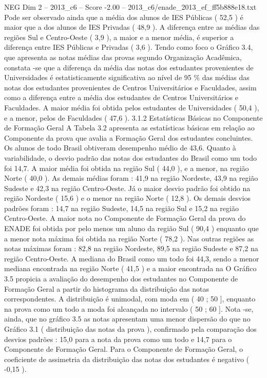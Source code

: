\begin{textsample}{NEG Dim 2 – 2013\_c6 – Score -2.00 – 2013\_c6/enade\_2013\_ef\_ff5b888e18.txt}
Pode ser observado ainda que a média dos alunos de IES Públicas ( 52,5 ) é maior que a dos alunos de IES Privadas ( 48,9 ).
A diferença entre as médias das regiões Sul e Centro-Oeste ( 3,9 ), a maior e a menor média, é superior a diferença entre IES Públicas e Privadas ( 3,6 ).
Tendo como foco o Gráfico 3.4, que apresenta as notas médias das provas segundo Organização Acadêmica, constata -se que a diferença da média das notas dos estudantes provenientes de Universidades é estatisticamente significativa ao nível de 95 \% das médias das notas dos estudantes provenientes de Centros Universitários e Faculdades, assim como a diferença entre a média dos estudantes de Centros Universitários e Faculdades.
A maior média foi obtida pelos estudantes de Universidades ( 50,4 ), e a menor, pelos de Faculdades ( 47,6 ). 3.1.2 Estatísticas Básicas no Componente de Formação Geral A Tabela 3.2 apresenta as estatísticas básicas em relação ao Componente da prova que avalia a Formação Geral dos estudantes concluintes.
Os alunos de todo Brasil obtiveram desempenho médio de 43,6.
Quanto à variabilidade, o desvio padrão das notas dos estudantes do Brasil como um todo foi 14,7.
A maior média foi obtida na região Sul ( 44,0 ), e a menor, na região Norte ( 40,0 ).
As demais médias foram : 41,9 na região Nordeste, 43,9 na região Sudeste e 42,3 na região Centro-Oeste.
Já o maior desvio padrão foi obtido na região Nordeste ( 15,6 ) e o menor na região Norte ( 12,8 ).
Os demais desvios padrões foram : 14,7 na região Sudeste, 14,5 na região Sul e 15,2 na região Centro-Oeste.
A maior nota no Componente de Formação Geral da prova do ENADE foi obtida por pelo menos um aluno da região Sul ( 90,4 ) enquanto que a menor nota máxima foi obtida na região Norte ( 78,2 ).
Nas outras regiões as notas máximas foram : 82,8 na região Nordeste, 89,5 na região Sudeste e 87,2 na região Centro-Oeste.
A mediana do Brasil como um todo foi 44,3, sendo a menor mediana encontrada na região Norte ( 41,5 ) e a maior encontrada na O Gráfico 3.5 propicia a avaliação do desempenho dos estudantes no Componente de Formação Geral a partir do histograma da distribuição das notas correspondentes.
A distribuição é unimodal, com moda em ( 40 ; 50 ], enquanto na prova como um todo a moda foi alcançada no intervalo ( 50 ; 60 ].
Nota -se, ainda, que no gráfico 3.5 as notas apresentam uma menor dispersão do que no Gráfico 3.1 ( distribuição das notas da prova ), confirmado pela comparação dos desvios padrões : 15,0 para a nota da prova como um todo e 14,7 para o Componente de Formação Geral.
Para o Componente de Formação Geral, o coeficiente de assimetria da distribuição das notas dos estudantes é negativo ( -0,15 ).

\end{textsample}
